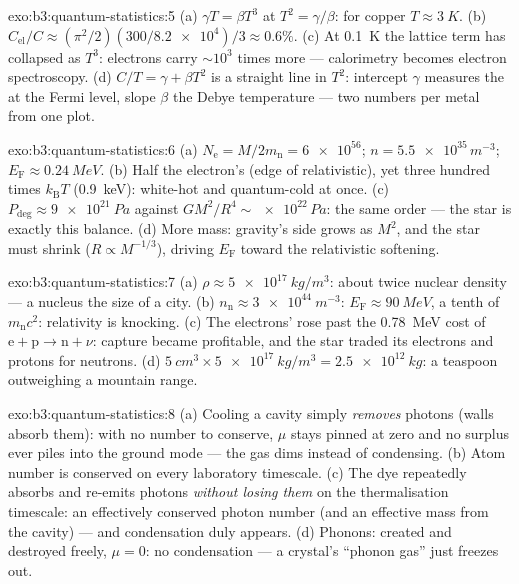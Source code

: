 \begin{solution}{exo:b3:quantum-statistics:5}
(a) $\gamma T = \beta T^3$ at $T^2 = \gamma/\beta$: for copper
$T \approx \qty{3}{K}$. (b) $C_{\text{el}}/C \approx
(\pi^2/2)(300/\num{8.2e4})/3 \approx 0.6\%$. (c) At \qty{0.1}{K}
the lattice term has collapsed as $T^3$: electrons carry
$\sim10^3$ times more --- calorimetry becomes electron
spectroscopy. (d) $C/T = \gamma + \beta T^2$ is a straight line in
$T^2$: intercept $\gamma$ measures the  at the
Fermi level, slope $\beta$ the Debye temperature --- two numbers
per metal from one plot.
\end{solution}

\begin{solution}{exo:b3:quantum-statistics:6}
(a) $N_{\text{e}} = M/2m_{\text{n}} = \num{6e56}$; $n =
\num{5.5e35}\,\unit{m^{-3}}$; $E_{\text{F}} \approx
\qty{0.24}{MeV}$. (b) Half the electron's  (edge of
relativistic), yet three hundred times $k_{\text{B}}T$
(\qty{0.9}{keV}): white-hot and quantum-cold at once. (c)
$P_{\text{deg}} \approx \qty{9e21}{Pa}$ against $GM^2/R^4 \sim
\num{e22}\,\unit{Pa}$: the same order --- the star is exactly this
balance. (d) More mass: gravity's side grows as $M^2$, and the
star must shrink ($R \propto M^{-1/3}$), driving $E_{\text{F}}$
toward the relativistic softening.
\end{solution}

\begin{solution}{exo:b3:quantum-statistics:7}
(a) $\rho \approx \qty{5e17}{kg/m^3}$: about twice nuclear
density --- a nucleus the size of a city. (b) $n_{\text{n}}
\approx \qty{3e44}{m^{-3}}$: $E_{\text{F}} \approx \qty{90}{MeV}$,
a tenth of $m_{\text{n}}c^2$: relativity is knocking. (c) The
electrons'  rose past the \qty{0.78}{MeV} cost of
$\text{e} + \text{p} \to \text{n} + \nu$: capture became
profitable, and the star traded its electrons and protons for
neutrons. (d) $\qty{5}{cm^3} \times \qty{5e17}{kg/m^3} =
\qty{2.5e12}{kg}$: a teaspoon outweighing a mountain range.
\end{solution}

\begin{solution}{exo:b3:quantum-statistics:8}
(a) Cooling a cavity simply \emph{removes} photons (walls absorb
them): with no number to conserve, $\mu$ stays pinned at zero and
no surplus ever piles into the ground mode --- the gas dims
instead of condensing. (b) Atom number is conserved on every
laboratory timescale. (c) The dye repeatedly absorbs and re-emits
photons \emph{without losing them} on the thermalisation
timescale: an effectively conserved photon number (and an
effective mass from the cavity) --- and condensation duly appears.
(d) Phonons: created and destroyed freely, $\mu = 0$: no
condensation --- a crystal's ``phonon gas'' just freezes out.
\end{solution}

